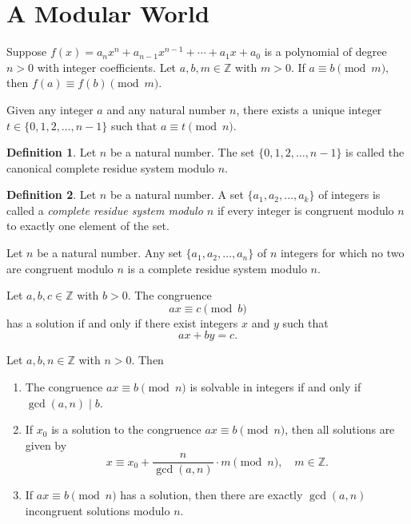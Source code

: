 \documentclass{article}
\theoremstyle{definition}
\newtheorem*{definition*}{Definition}
\newenvironment{manualtheorem}[1]{%
  \renewcommand{\thetheorem}{#1}%
  \theorem%
}{%
  \endtheorem%
}
\begin{document}
\section{A Modular World}

\begin{manualtheorem}{3.8}
	Suppose \(f(x) = a_n x^n + a_{n-1} x^{n-1} + \cdots + a_1 x + a_0\)
	is a polynomial of degree $n > 0$ with integer coefficients.
	Let $a, b, m \in \mathbb{Z}$ with $m > 0$.
	If \(a \equiv b \pmod{m},\)
	then \(f(a) \equiv f(b) \pmod{m}.\)
\end{manualtheorem}

\begin{manualtheorem}{3.14}
	Given any integer $a$ and any natural number $n$, there exists a unique integer \\ $t
		\in \{0,1,2,\ldots,n-1\}$ such that $a \equiv t \pmod{n}$.
\end{manualtheorem}

\begin{definition*}
	Let $n$ be a natural number. The set $\{0,1,2,\ldots,n-1\}$ is
	called the canonical complete residue system modulo $n$.
\end{definition*}

\begin{definition*}
	Let $n$ be a natural number. A set $\{a_{1}, a_{2}, \ldots, a_{k}\}$ of integers is called a
	\emph{complete residue system modulo $n$} if every integer is congruent modulo $n$ to exactly
	one element of the set.
\end{definition*}


\begin{manualtheorem}{3.17}
	Let $n$ be a natural number. Any set $\{a_1, a_2, \ldots, a_n\}$ of $n$ integers
	for which no two are congruent modulo $n$ is a complete residue system modulo $n$.
\end{manualtheorem}

\begin{manualtheorem}{3.19}
	Let $a, b, c \in \mathbb{Z}$ with $b > 0$. The congruence
	\[
		ax \equiv c \pmod{b}
	\]
	has a solution if and only if there exist integers $x$ and $y$ such that
	\[
		ax + by = c.
	\]
\end{manualtheorem}

\begin{manualtheorem}{3.24}
	Let $a, b, n \in \mathbb{Z}$ with $n > 0$. Then
	\begin{enumerate}
		\item The congruence $ax \equiv b \pmod{n}$ is solvable in integers if and only if $\gcd(a,n) \mid b$.
		\item If $x_{0}$ is a solution to the congruence $ax \equiv b \pmod{n}$, then all solutions are given by
		      \[
			      x \equiv x_{0} + \frac{n}{\gcd(a,n)} \cdot m \pmod{n}, \quad m \in \mathbb{Z}.
		      \]
		\item If $ax \equiv b \pmod{n}$ has a solution, then there are exactly $\gcd(a,n)$ incongruent solutions modulo $n$.
	\end{enumerate}

\end{manualtheorem}
\end{document}
